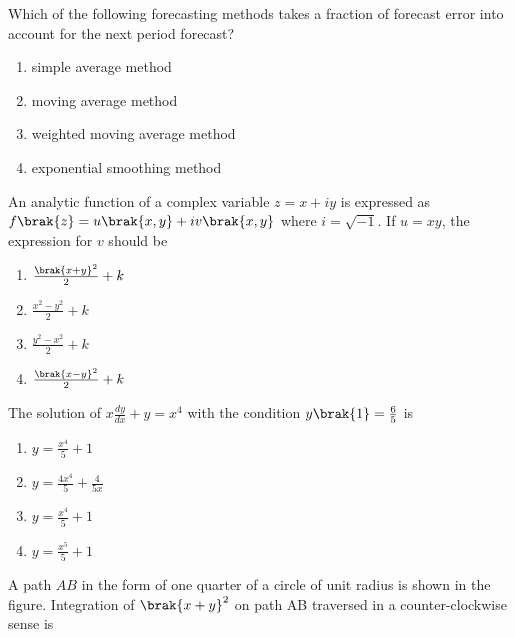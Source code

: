 \item Which of the following forecasting methods takes a fraction of forecast
error into account for the next period forecast?
\begin{multicols}{2}
\begin{enumerate}
    \item simple average method
    \item moving average method
    \item weighted moving average method
    \item exponential smoothing method
\end{enumerate}
\end{multicols}

\item An analytic function of a complex variable $z = x + iy$ is expressed as
$f\brak{z} = u\brak{x, y} + iv\brak{x, y}$ where $i = \sqrt{-1}$. If $u = xy$, the expression
for $v$ should be
\begin{multicols}{4}
\begin{enumerate}
    \item $\frac{\brak{x + y}^2}{2} + k$
    \item $\frac{x^2 - y^2}{2} + k$
    \item $\frac{y^2 - x^2}{2} + k$
    \item $\frac{\brak{x - y}^2}{2} + k$
\end{enumerate}
\end{multicols}

\item The solution of $x\frac{dy}{dx} + y = x^4$ with the condition
$y\brak{1} = \frac{6}{5}$ is
\begin{multicols}{4}
\begin{enumerate}
    \item $y = \frac{x^4}{5} + 1$
    \item $y = \frac{4x^4}{5} + \frac{4}{5x}$
    \item $y = \frac{x^4}{5} + 1$
    \item $y = \frac{x^5}{5} + 1$
\end{enumerate}
\end{multicols}

\item A path $AB$ in the form of one quarter of a circle of unit radius is shown
in the figure. Integration of $\brak{x + y}^2$ on path AB traversed in a
counter-clockwise sense is

\begin{center}
\end{center}

